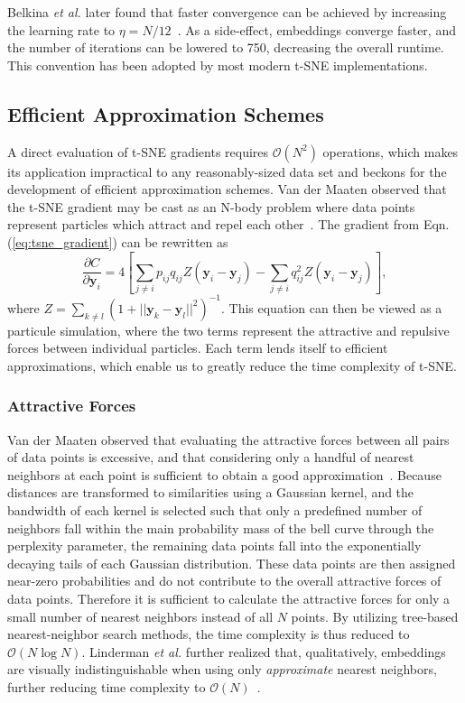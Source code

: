 \documentclass[twocolumn]{bmcart}
\begin{document}
Belkina \textit{et al.} later found that faster convergence can be achieved by
increasing the learning rate to $\eta=N/12$~\cite{belkina2019automated}. As a side-effect, embeddings converge faster, and the
number of iterations can be lowered to 750, decreasing the overall runtime.
This convention has been adopted by most modern t-SNE implementations.

\subsection*{Efficient Approximation Schemes} A direct evaluation of t-SNE
gradients requires $\mathcal{O}(N^2)$ operations, which makes its application
impractical to any reasonably-sized data set and beckons for the development of
efficient approximation schemes. Van der Maaten observed that the t-SNE
gradient may be cast as an N-body problem where data points represent
particles which attract and repel each
other~\cite{van2014accelerating}. The gradient from Eqn. (\ref{eq:tsne_gradient}) can be rewritten as
\begin{equation}
\frac{\partial C}{\partial \mathbf{y}_i} = 4 \left [ \sum_{j \neq i} p_{ij} q_{ij} Z \left ( \mathbf{y}_i - \mathbf{y}_j \right ) -\sum_{j \neq i} q_{ij}^2 Z \left ( \mathbf{y}_i - \mathbf{y}_j \right ) \right ], \label{eq:grad_attr_rep}
\end{equation}
where $Z = \sum_{k \neq l}\left ( 1 + || \mathbf{y}_k - \mathbf{y}_l ||^2
\right )^{-1}$. This equation can then be viewed as a particule simulation, where 
the two terms represent the attractive and repulsive
forces between individual particles. Each term lends itself to efficient
approximations, which enable us to greatly reduce the time complexity of t-SNE.

\subsubsection*{Attractive Forces}

Van der Maaten observed that evaluating the attractive forces between all pairs
of data points is excessive, and that considering only a handful of nearest
neighbors at each point is sufficient to obtain a good approximation~\cite{van2014accelerating}.
Because distances are transformed to similarities using a Gaussian kernel, and
the bandwidth of each kernel is selected such that only a predefined number of
neighbors fall within the main probability mass of the bell curve through the perplexity parameter, the remaining
data points fall into the exponentially decaying tails of each Gaussian distribution.
These data points are then assigned near-zero probabilities and do not contribute
to the overall attractive forces of data points.
Therefore it is sufficient to calculate the attractive forces for only a
small number of nearest neighbors instead of all $N$ points. By
utilizing tree-based nearest-neighbor search methods, the time complexity is
thus reduced to $\mathcal{O}(N \log N)$. Linderman \textit{et al.} further
realized that, qualitatively, embeddings are visually
indistinguishable when using only \textit{approximate} nearest neighbors,
further reducing time complexity to $\mathcal{O}(N)$~\cite{linderman2019fast}.
\end{document}
